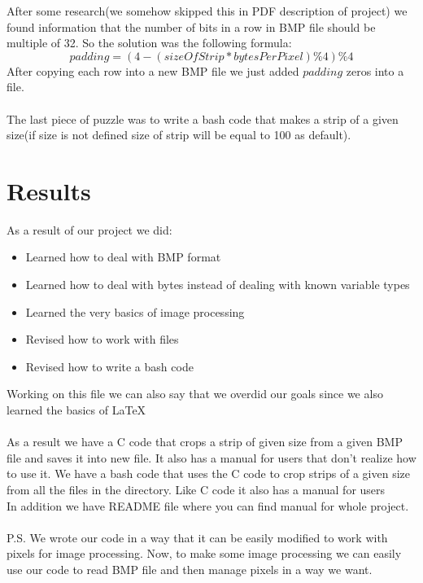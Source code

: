 \documentclass[a4paper]{article}
\begin{document}
After some research(we somehow skipped this in PDF description of project) we found information that the number of bits in a row in BMP file should be multiple of 32. So the solution was the following formula:
\[padding = (4 - (size Of Strip * bytes Per Pixel) \% 4) \% 4\]
After copying each row into a new BMP file we just added $padding$ zeros into a file.
\\
\\
The last piece of puzzle was to write a bash code that makes a strip of a given size(if size is not defined size of strip will be equal to 100 as default).

\section{Results}
As a result of our project we did:
\begin{itemize}
\item Learned how to deal with BMP format
\item Learned how to deal with bytes instead of dealing with known variable types 
\item Learned the very basics of image processing
\item Revised how to work with files
\item Revised how to write a bash code
\end{itemize}
Working on this file we can also say that we overdid our goals since we also learned the basics of \LaTeX \\\\
As a result we have a C code that crops a strip of given size from a given BMP file and saves it into new file. It also has a manual for users that don't realize how to use it. We have a bash code that uses the C code to crop strips of a given size from all the files in the directory. Like C code it also has a manual for users\\
In addition we have README file where you can find manual for whole project.\\\\
P.S. We wrote our code in a way that it can be easily modified to work with pixels for image processing. Now, to make some image processing we can easily use our code to read BMP file and then manage pixels in a way we want.
\end{document}
